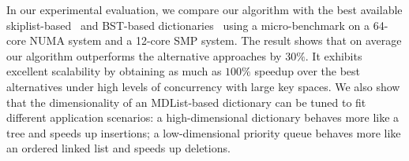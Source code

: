 \documentclass{article}
\begin{document}
In our experimental evaluation, we compare our algorithm with the best available skiplist-based~\cite{dick2014logarithmic,fraser2004practical} and BST-based dictionaries~\cite{ellen2014amortized,arbel2014concurrent,bronson2010practical} using a micro-benchmark on a 64-core NUMA system and a 12-core SMP system.
The result shows that on average our algorithm outperforms the alternative approaches by $30\%$.
It exhibits excellent scalability by obtaining as much as $100\%$ speedup over the best alternatives under high levels of concurrency with large key spaces.
We also show that the dimensionality of an MDList-based dictionary can be tuned to fit different application scenarios: a high-dimensional dictionary behaves more like a tree and speeds up insertions; a low-dimensional priority queue behaves more like an ordered linked list and speeds up deletions.



\end{document}
